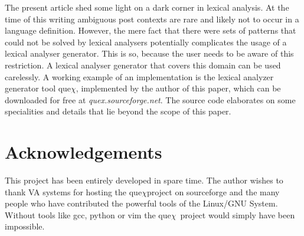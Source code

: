 \documentclass[acmtoplas]{acmtrans2m}
\newcommand{\quex}{que$\chi$}
\begin{document}
The present article shed some light on a dark corner in lexical analysis. At
the time of this writing ambiguous post contexts are rare and likely not to
occur in a language definition. However, the mere fact that there were sets of
patterns that could not be solved by lexical analysers potentially complicates
the usage of a lexical analyser generator. This is so, because the user needs
to be aware of this restriction. A lexical analyser generator that covers this
domain can be used carelessly.  A working example of an implementation is the
lexical analyzer generator tool \quex, implemented by the author of this
paper, which can be downloaded for free at {\it quex.sourceforge.net}. 
The source code elaborates on some specialities and details that lie
beyond the scope of this paper.

\section{Acknowledgements}

This project has been entirely developed in spare time.  The author wishes to
thank VA systems for hosting the \quex project on sourceforge and the many
people who have contributed the powerful tools of the Linux/GNU System. Without
tools like gcc, python or vim the \quex\ project would simply have been
impossible.




\end{document}
